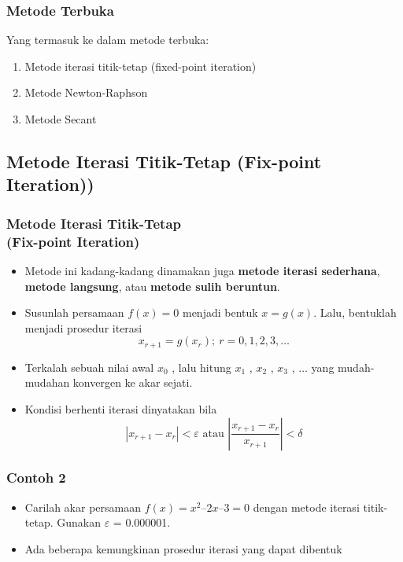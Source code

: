 \documentclass[pdflatex,compress]{beamer}
\begin{document}
\begin{frame}
	\frametitle{Metode Terbuka}
	Yang termasuk ke dalam metode terbuka:
	\begin{enumerate}
		\item Metode iterasi titik-tetap (fixed-point iteration)
		\item Metode Newton-Raphson
		\item Metode Secant
	\end{enumerate}
\end{frame}

\subsection{Metode Iterasi Titik-Tetap (Fix-point Iteration))}

\begin{frame}
	\frametitle{Metode Iterasi Titik-Tetap\\(Fix-point Iteration)}
	\begin{itemize}
		\item Metode ini kadang-kadang dinamakan juga \textbf{metode iterasi sederhana}, \textbf{metode langsung}, atau \textbf{metode sulih beruntun}.
		\item Susunlah persamaan $ f(x) = 0 $ menjadi bentuk $ x = g(x) $. Lalu, bentuklah menjadi prosedur iterasi
		\[ x_{r+1} = g(x_r);~r = 0,1,2,3,\dots \]
		\item Terkalah sebuah nilai awal $ x_0 $ , lalu hitung $ x_1 $ , $ x_2 $ , $ x_3 $ , $ \dots $ yang mudah-mudahan konvergen ke akar sejati.
		\item Kondisi berhenti iterasi dinyatakan bila
		\[ |x_{r+1} - x_r | < \varepsilon \text{ atau } \left| \frac{x_{r+1} - x_r}{x_{r+1}} \right| < \delta\]
	\end{itemize}
\end{frame}

\begin{frame}
	\frametitle{Contoh 2}
	\begin{itemize}
		\item Carilah akar persamaan $ f(x) = x^2 – 2x – 3 = 0 $ dengan metode iterasi titik-tetap. Gunakan $\varepsilon$ = 0.000001.
		\item Ada beberapa kemungkinan prosedur iterasi yang dapat dibentuk
	\end{itemize}
\end{frame}
\end{document}
